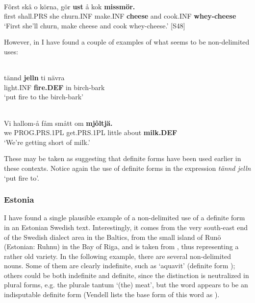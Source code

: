 \ea \label{} 
\\
\gll Fôrst  skâ  o  körna,  gör  \textbf{ust} å  kok  \textbf{missmör.} \\
first  shall.PRS  she  churn.INF  make.INF  \textbf{cheese} and  cook.INF  \textbf{whey-cheese} \\
\glt ‘First she’ll churn, make cheese and cook whey-cheese.’ [S48]

\z

However, in \citet{LevanderEtAl1961-} I have found a couple of examples of what seems to be non-delimited uses:


\ea \label{} 
\\
\gll tännd  \textbf{jelln} ti  nävra\\
light.INF  \textbf{fire.DEF} in  birch-bark\\
\glt ‘put fire to the birch-bark’

\z

\ea \label{} 
\\
\gll Vi  hallom-å  fåm  smått  om  \textbf{mjôltjä.}\\
we  PROG.PRS.1PL  get.PRS.1PL  little  about  \textbf{milk.DEF}\\
\glt ‘We’re getting short of milk.’

\z

These may be taken as suggesting that definite forms have been used earlier in these contexts.  Notice again the use of definite forms in the expression \textit{tännd jelln} ‘put fire to’.


\subsubsection{Estonia}
 I have found a single plausible example of a non-delimited use of a definite form in an Estonian Swedish text. Interestingly, it comes from the very south-east end of the Swedish dialect area in the Baltics, from the small island of Runö (Estonian: Ruhnu) in the Bay of Riga, and is taken from \citet{Vendell1882}, thus representing a rather old variety. In the following example, there are several non-delimited nouns. Some of them are clearly indefinite, such as  ‘aquavit’ (definite form ); others could be both indefinite and definite, since the distinction is neutralized in plural forms, e.g. the plurale tantum  ‘(the) meat’, but the word  appears to be an indisputable definite form (Vendell lists the base form of this word as ).

